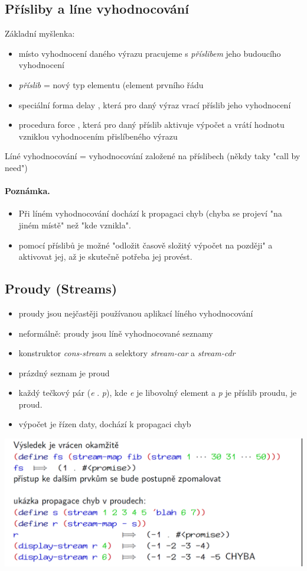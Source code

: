 \documentclass[10pt,a4paper]{article}
\begin{document}
\subsection{Přísliby a líne vyhodnocování}
Základní myšlenka:
\begin{itemize}
	\item místo vyhodnocení daného výrazu pracujeme s \textit{příslibem} jeho budoucího vyhodnocení
	\item \textit{příslib} = nový typ elementu (element prvního řádu
	\item speciální forma \color{blue} delay \color{black}, která pro daný výraz vrací příslib jeho vyhodnocení
	\item procedura \color{blue} force \color{black}, která pro daný příslib aktivuje výpočet a vrátí hodnotu vzniklou vyhodnocením přislíbeného výrazu
\end{itemize}
Líné vyhodnocování = vyhodnocování založené na příslibech (někdy taky "call by need")
\paragraph{Poznámka.}
\begin{itemize}
	\item Při líném vyhodnocování dochází k propagaci chyb (chyba se projeví "na jiném místě" než "kde vznikla".
	\item pomocí příslibů je možné "odložit časově složitý výpočet na později" a aktivovat jej, až je skutečně potřeba jej provést.
\end{itemize}

\subsection{Proudy (Streams)}
\begin{itemize}
	\item proudy jsou nejčastěji používanou aplikací líného vyhodnocování
	\item neformálně: proudy jsou líně vyhodnocované seznamy
	\item konstruktor \textit{cons-stream} a selektory \textit{stream-car} a \textit{stream-cdr}
	\item prázdný seznam je proud
	\item každý tečkový pár (\textit{e} . \textit{p}), kde \textit{e} je libovolný element a \textit{p} je příslib proudu, je proud.
	\item výpočet je řízen daty, dochází k propagaci chyb
\end{itemize}
\begin{center}
	\includegraphics[scale=0.35]{img/streams_1}
\end{center}
\end{document}
